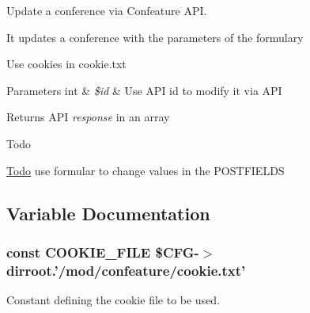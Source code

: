 Update a conference via Confeature A\-P\-I. 

It updates a conference with the parameters of the formulary\par
 Use cookies in cookie.\-txt 
\begin{DoxyParams}[1]{Parameters}
int & {\em \$id} & Use A\-P\-I id to modify it via A\-P\-I \\
\hline
\end{DoxyParams}
\begin{DoxyReturn}{Returns}
A\-P\-I {\itshape response} in an array 
\end{DoxyReturn}
\begin{DoxyRefDesc}{Todo}
\item[\hyperlink{todo__todo000007}{Todo}]use formular to change values in the P\-O\-S\-T\-F\-I\-E\-L\-D\-S \end{DoxyRefDesc}


\subsection{Variable Documentation}
\hypertarget{locallib_8php_a30f006ca5997500742610df15bccc1a2}{
\subsubsection[{C\-O\-O\-K\-I\-E\-\_\-\-F\-I\-L\-E}]{\setlength{\rightskip}{0pt plus 5cm}const C\-O\-O\-K\-I\-E\-\_\-\-F\-I\-L\-E \$C\-F\-G-\/$>$dirroot.'/mod/confeature/cookie.\-txt'}}\label{locallib_8php_a30f006ca5997500742610df15bccc1a2}


Constant defining the cookie file to be used. 

